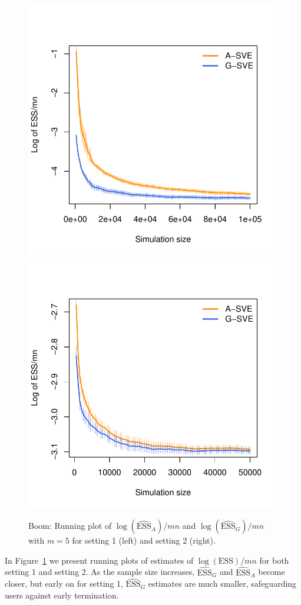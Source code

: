 \documentclass[11pt]{article}
\theoremstyle{remark}
\begin{document}
\begin{figure}[htbp]
    \centering
      \includegraphics[width = .30\textwidth]{plots/boom-ess_1_3_8_m5.pdf}
      \includegraphics[width = .30\textwidth]{plots/boom-ess_1_10_7_m5.pdf}          

    \caption{Boom: Running plot of $\log (\widehat{\text{ESS}}_A )/mn$ and $\log (\widehat{\text{ESS}}_G )/mn$ with $m = 5$ for setting 1 (left) and setting 2 (right).}
    \label{fig:boom-ess}
\end{figure}

In Figure~\ref{fig:boom-ess} we present running plots of estimates of $\log(\textrm{ESS})/mn$ for both setting 1 and setting 2. As the sample size increases, $\widehat{\text{ESS}}_G$ and  $\widehat{\text{ESS}}_A$ become closer, but early on for setting 1, $\widehat{\text{ESS}}_G$ estimates are much smaller, safeguarding users against early termination.


\end{document}
